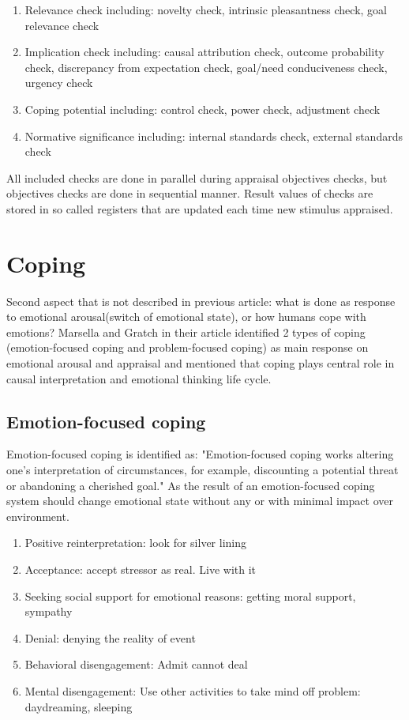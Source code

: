 \begin{enumerate}
 \item  Relevance check including: novelty check, intrinsic pleasantness check, goal relevance check
 \item  Implication check including: causal attribution check, outcome probability check, discrepancy from expectation check, goal/need conduciveness check, urgency check
 \item  Coping potential including: control check, power check, adjustment check
 \item  Normative significance including: internal standards check, external standards check
\end{enumerate}

All included checks are done in parallel during appraisal objectives checks, but objectives checks are done in sequential manner.
Result values of checks are stored in so called registers that are updated each time new stimulus appraised.

\section{Coping}

Second aspect that is not described in previous article: what is done as response to emotional arousal(switch of emotional state), or how humans cope with emotions?
Marsella and Gratch in their article \cite{dont_worry_be_happy} identified 2 types of coping (emotion-focused coping and problem-focused coping) as main response on emotional arousal and appraisal and mentioned that coping plays central role in causal interpretation and emotional thinking life cycle.

\subsection{Emotion-focused coping}

Emotion-focused coping is identified as: "Emotion-focused coping works altering one’s interpretation of circumstances, for example, discounting a potential threat or abandoning a cherished goal." As the result of an emotion-focused coping system should change emotional state without any or with minimal impact over environment.

\begin{enumerate}
 \item  Positive reinterpretation: look for silver lining
 \item  Acceptance: accept stressor as real. Live with it
 \item  Seeking  social  support  for  emotional  reasons: getting moral support, sympathy
 \item  Denial: denying the reality of event
 \item  Behavioral disengagement: Admit cannot deal
 \item  Mental  disengagement:  Use  other  activities  to take mind off problem: daydreaming, sleeping
\end{enumerate}

